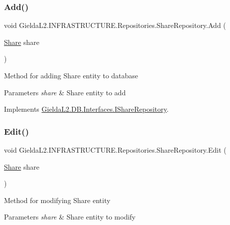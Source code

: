 \subsubsection{\texorpdfstring{Add()}{Add()}}
{\footnotesize\ttfamily void Gielda\+L2.\+I\+N\+F\+R\+A\+S\+T\+R\+U\+C\+T\+U\+R\+E.\+Repositories.\+Share\+Repository.\+Add (\begin{DoxyParamCaption}\item[{\mbox{\hyperlink{class_gielda_l2_1_1_d_b_1_1_entities_1_1_share}{Share}}}]{share }\end{DoxyParamCaption})}



Method for adding Share entity to database 


\begin{DoxyParams}{Parameters}
{\em share} & Share entity to add\\
\hline
\end{DoxyParams}


Implements \mbox{\hyperlink{interface_gielda_l2_1_1_d_b_1_1_interfaces_1_1_i_share_repository_a92f21844eefac0604d9d195aa1f15214}{Gielda\+L2.\+D\+B.\+Interfaces.\+I\+Share\+Repository}}.

\mbox{\label{class_gielda_l2_1_1_i_n_f_r_a_s_t_r_u_c_t_u_r_e_1_1_repositories_1_1_share_repository_ac3b39b1ed8794698ad74054688667e6a}} 
\subsubsection{\texorpdfstring{Edit()}{Edit()}}
{\footnotesize\ttfamily void Gielda\+L2.\+I\+N\+F\+R\+A\+S\+T\+R\+U\+C\+T\+U\+R\+E.\+Repositories.\+Share\+Repository.\+Edit (\begin{DoxyParamCaption}\item[{\mbox{\hyperlink{class_gielda_l2_1_1_d_b_1_1_entities_1_1_share}{Share}}}]{share }\end{DoxyParamCaption})}



Method for modifying Share entity 


\begin{DoxyParams}{Parameters}
{\em share} & Share entity to modify\\
\hline
\end{DoxyParams}


